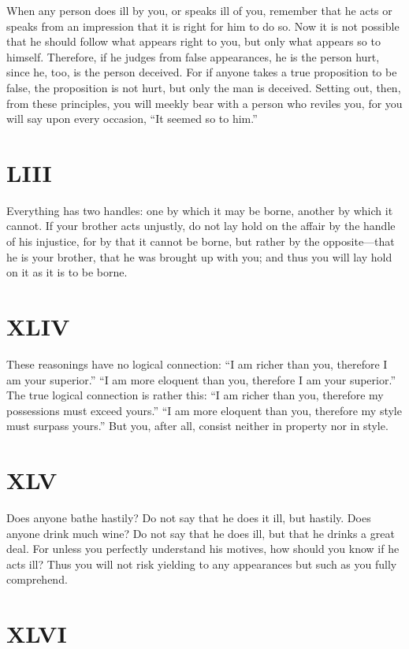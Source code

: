 \documentclass[11pt]{article}
\begin{document}
When any person does ill by you, or speaks ill of you, remember that he acts or speaks from an impression that it is right for him to do so. Now it is not possible that he should follow what appears right to you, but only what appears so to himself. Therefore, if he judges from false appearances, he is the person hurt, since he, too, is the person deceived. For if anyone takes a true proposition to be false, the proposition is not hurt, but only the man is deceived. Setting out, then, from these principles, you will meekly bear with a person who reviles you, for you will say upon every occasion, “It seemed so to him.”
\section*{LIII}

Everything has two handles: one by which it may be borne, another by which it cannot. If your brother acts unjustly, do not lay hold on the affair by the handle of his injustice, for by that it cannot be borne, but rather by the opposite—that he is your brother, that he was brought up with you; and thus you will lay hold on it as it is to be borne.
\section*{XLIV}

These reasonings have no logical connection: “I am richer than you, therefore I am your superior.” “I am more eloquent than you, therefore I am your superior.” The true logical connection is rather this: “I am richer than you, therefore my possessions must exceed yours.” “I am more eloquent than you, therefore my style must surpass yours.” But you, after all, consist neither in property nor in style.
\section*{XLV}

Does anyone bathe hastily? Do not say that he does it ill, but hastily. Does anyone drink much wine? Do not say that he does ill, but that he drinks a great deal. For unless you perfectly understand his motives, how should you know if he acts ill? Thus you will not risk yielding to any appearances but such as you fully comprehend.
\section*{XLVI}
\end{document}
